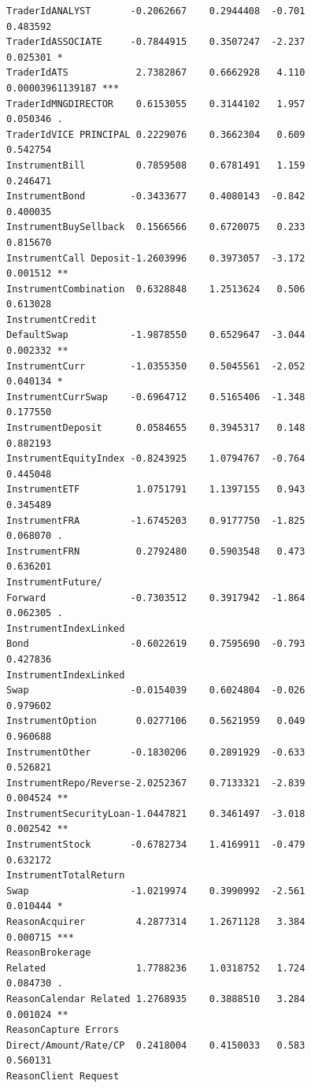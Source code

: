 \documentclass{DissertateUSU}
\begin{document}
\begin{verbatim}
TraderIdANALYST       -0.2062667    0.2944408  -0.701             0.483592    
TraderIdASSOCIATE     -0.7844915    0.3507247  -2.237             0.025301 *  
TraderIdATS            2.7382867    0.6662928   4.110     0.00003961139187 ***
TraderIdMNGDIRECTOR    0.6153055    0.3144102   1.957             0.050346 .  
TraderIdVICE PRINCIPAL 0.2229076    0.3662304   0.609             0.542754    
InstrumentBill         0.7859508    0.6781491   1.159             0.246471    
InstrumentBond        -0.3433677    0.4080143  -0.842             0.400035    
InstrumentBuySellback  0.1566566    0.6720075   0.233             0.815670    
InstrumentCall Deposit-1.2603996    0.3973057  -3.172             0.001512 ** 
InstrumentCombination  0.6328848    1.2513624   0.506             0.613028    
InstrumentCredit
DefaultSwap           -1.9878550    0.6529647  -3.044             0.002332 ** 
InstrumentCurr        -1.0355350    0.5045561  -2.052             0.040134 *  
InstrumentCurrSwap    -0.6964712    0.5165406  -1.348             0.177550    
InstrumentDeposit      0.0584655    0.3945317   0.148             0.882193    
InstrumentEquityIndex -0.8243925    1.0794767  -0.764             0.445048    
InstrumentETF          1.0751791    1.1397155   0.943             0.345489    
InstrumentFRA         -1.6745203    0.9177750  -1.825             0.068070 .  
InstrumentFRN          0.2792480    0.5903548   0.473             0.636201    
InstrumentFuture/
Forward               -0.7303512    0.3917942  -1.864             0.062305 .  
InstrumentIndexLinked
Bond                  -0.6022619    0.7595690  -0.793             0.427836    
InstrumentIndexLinked
Swap                  -0.0154039    0.6024804  -0.026             0.979602    
InstrumentOption       0.0277106    0.5621959   0.049             0.960688    
InstrumentOther       -0.1830206    0.2891929  -0.633             0.526821    
InstrumentRepo/Reverse-2.0252367    0.7133321  -2.839             0.004524 ** 
InstrumentSecurityLoan-1.0447821    0.3461497  -3.018             0.002542 ** 
InstrumentStock       -0.6782734    1.4169911  -0.479             0.632172    
InstrumentTotalReturn
Swap                  -1.0219974    0.3990992  -2.561             0.010444 *  
ReasonAcquirer         4.2877314    1.2671128   3.384             0.000715 ***
ReasonBrokerage 
Related                1.7788236    1.0318752   1.724             0.084730 .  
ReasonCalendar Related 1.2768935    0.3888510   3.284             0.001024 ** 
ReasonCapture Errors    
Direct/Amount/Rate/CP  0.2418004    0.4150033   0.583             0.560131  
ReasonClient Request

\end{verbatim}
\end{document}
